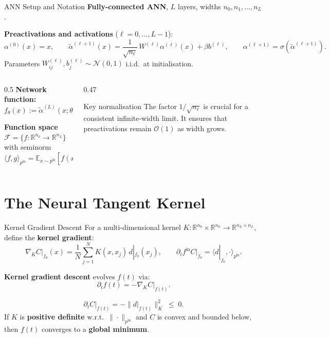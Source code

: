 \documentclass[aspectratio=169, 10pt]{beamer}
\newcommand{\R}{\mathbb{R}}
\newcommand{\E}{\mathbb{E}}
\newcommand{\pin}{p^{\mathrm{in}}}
\newcommand{\fth}{f_\theta}
\newcommand{\kgrad}{\nabla_K C}
\newcommand{\highlight}[1]{\textcolor{blue!70!black}{\textbf{#1}}}
\begin{document}
\begin{frame}{ANN Setup and Notation}
  \textbf{Fully-connected ANN}, $L$ layers, widths $n_0, n_1, \ldots, n_L$.

  \medskip
  \textbf{Preactivations and activations} ($\ell = 0,\ldots,L-1$):
  \[
    \alpha^{(0)}(x) = x, \qquad
    \tilde\alpha^{(\ell+1)}(x) = \frac{1}{\sqrt{n_\ell}}\, W^{(\ell)}\alpha^{(\ell)}(x) + \beta b^{(\ell)}, \qquad
    \alpha^{(\ell+1)} = \sigma\!\left(\tilde\alpha^{(\ell+1)}\right).
  \]
  Parameters $W^{(\ell)}_{ij}, b^{(\ell)}_j \sim \mathcal{N}(0,1)$ i.i.d.\ at initialisation.

  \medskip
  \begin{columns}[T]
    \begin{column}{0.5\textwidth}
      \textbf{Network function:} $\fth(x) := \tilde\alpha^{(L)}(x;\theta) \in \R^{n_L}$

      \medskip
      \textbf{Function space} $\mathcal{F} = \{f: \R^{n_0}\to\R^{n_L}\}$ with seminorm
      \[
        \langle f,g\rangle_{\pin} = \E_{x\sim\pin}[f(x)^\top g(x)].
      \]
    \end{column}
    \begin{column}{0.47\textwidth}
      \begin{alertblock}{Key normalisation}
        The factor $1/\sqrt{n_\ell}$ is crucial for a consistent infinite-width limit. It ensures that preactivations remain $\mathcal{O}(1)$ as width grows.
      \end{alertblock}
    \end{column}
  \end{columns}
\end{frame}

\section{The Neural Tangent Kernel}

\begin{frame}{Kernel Gradient Descent}
  For a multi-dimensional kernel $K: \R^{n_0}\times\R^{n_0}\to\R^{n_L\times n_L}$, define the \textbf{kernel gradient}:
  \[
    \kgrad\big|_{f_0}(x) = \frac{1}{N}\sum_{j=1}^N K(x, x_j)\, d|_{f_0}(x_j),
    \qquad \partial_t f^{\mathrm{in}}C\big|_{f_0} = \langle d|_{f_0}, \cdot\rangle_{\pin}.
  \]

  \textbf{Kernel gradient descent} evolves $f(t)$ via:
  \[
    \partial_t f(t) = -\kgrad\big|_{f(t)}.
  \]

  \begin{theorem}
    \[
      \partial_t C\big|_{f(t)} = -\|d|_{f(t)}\|^2_K \;\leq\; 0.
    \]
    If $K$ is \highlight{positive definite} w.r.t.\ $\|\cdot\|_{\pin}$ and $C$ is convex and bounded below, then $f(t)$ converges to a \highlight{global minimum}.
  \end{theorem}
\end{frame}
\end{document}
